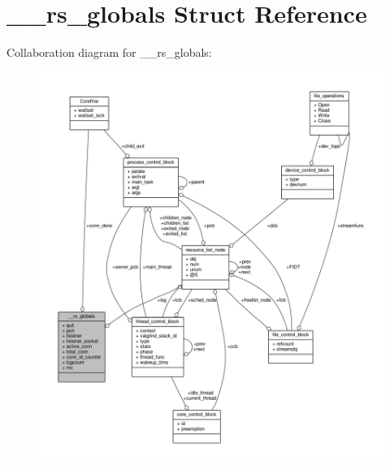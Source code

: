 \hypertarget{struct____rs__globals}{}\section{\+\_\+\+\_\+rs\+\_\+globals Struct Reference}
\label{struct____rs__globals}


Collaboration diagram for \+\_\+\+\_\+rs\+\_\+globals\+:
\nopagebreak
\begin{figure}[H]
\begin{center}
\leavevmode
\includegraphics[width=350pt]{struct____rs__globals__coll__graph}
\end{center}
\end{figure}
